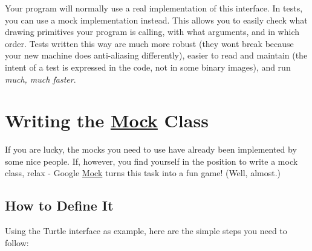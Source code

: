 Your program will normally use a real implementation of this interface. In tests, you can use a mock implementation instead. This allows you to easily check what drawing primitives your program is calling, with what arguments, and in which order. Tests written this way are much more robust (they won\textquotesingle{}t break because your new machine does anti-\/aliasing differently), easier to read and maintain (the intent of a test is expressed in the code, not in some binary images), and run {\itshape much, much faster}.

\section*{Writing the \mbox{\hyperlink{class_mock}{Mock}} Class}

If you are lucky, the mocks you need to use have already been implemented by some nice people. If, however, you find yourself in the position to write a mock class, relax -\/ Google \mbox{\hyperlink{class_mock}{Mock}} turns this task into a fun game! (Well, almost.)

\subsection*{How to Define It}

Using the {\ttfamily Turtle} interface as example, here are the simple steps you need to follow\+:


